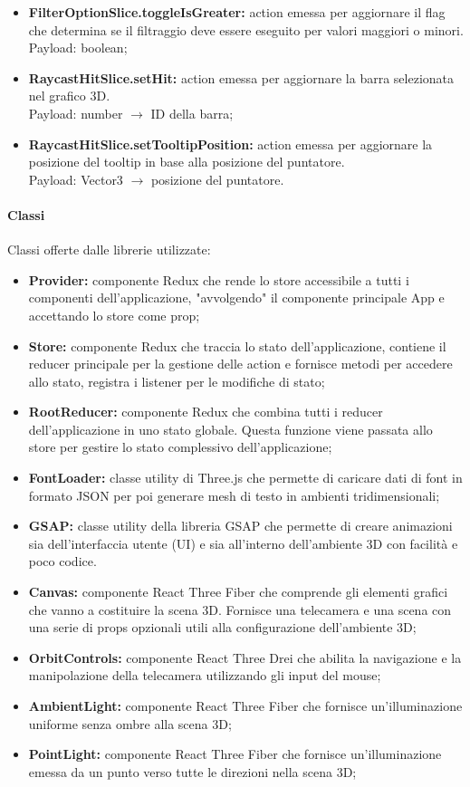 \begin{itemize}
      \item \textbf{FilterOptionSlice.toggleIsGreater:} action emessa per aggiornare il flag che determina se il filtraggio deve essere eseguito per valori maggiori o minori. \\ Payload: boolean;
      \item \textbf{RaycastHitSlice.setHit:} action emessa per aggiornare la barra selezionata nel grafico 3D. \\ Payload: number $\rightarrow$ ID della barra;
      \item \textbf{RaycastHitSlice.setTooltipPosition:} action emessa per aggiornare la posizione del tooltip in base alla posizione del puntatore.\\ Payload: Vector3 $\rightarrow$ posizione del puntatore.
\end{itemize}
\paragraph{Classi}
Classi offerte dalle librerie utilizzate:
\begin{itemize}
      \item \textbf{Provider:} componente Redux che rende lo store accessibile a tutti i componenti dell'applicazione, "avvolgendo" il componente principale App e accettando lo store come prop;
      \item \textbf{Store:} componente Redux che traccia lo stato dell'applicazione, contiene il reducer principale per la gestione delle action e fornisce metodi per accedere allo stato,
            registra i listener per le modifiche di stato;
      \item \textbf{RootReducer:} componente Redux che combina tutti i reducer dell'applicazione in uno stato
            globale. Questa funzione viene passata allo store per gestire lo stato complessivo dell'applicazione;
      \item \textbf{FontLoader:} classe utility di Three.js che permette di caricare dati di font in formato JSON per poi generare mesh di testo in ambienti tridimensionali;
      \item \textbf{GSAP:} classe utility della libreria GSAP che permette di creare animazioni sia dell'interfaccia utente (UI) e sia all'interno dell'ambiente 3D con facilità e poco codice.
      \item \textbf{Canvas:} componente React Three Fiber che comprende gli elementi grafici che vanno a costituire la scena 3D.
            Fornisce una telecamera e una scena con una serie di props opzionali utili alla configurazione dell'ambiente 3D;
      \item \textbf{OrbitControls:} componente React Three Drei che abilita la navigazione e la manipolazione della telecamera utilizzando gli input del mouse;
      \item \textbf{AmbientLight:} componente React Three Fiber che fornisce un'illuminazione uniforme senza ombre alla scena 3D;
      \item \textbf{PointLight:} componente React Three Fiber che fornisce un'illuminazione emessa da un punto verso tutte le direzioni nella scena 3D;
\end{itemize}
